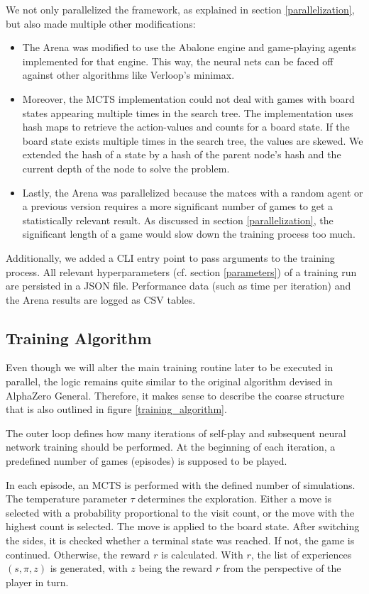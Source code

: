 We not only parallelized the framework, as explained in section \ref{parallelization}, but also made multiple other modifications:
\begin{itemize}
    \item The Arena was modified to use the Abalone engine \cite{claussen_abalone_2021} and game-playing agents implemented for that engine. This way, the neural nets can be faced off against other algorithms like Verloop's minimax.
    \item Moreover, the MCTS implementation could not deal with games with board states appearing multiple times in the search tree. The implementation uses hash maps to retrieve the action-values and counts for a board state. If the board state exists multiple times in the search tree, the values are skewed. We extended the hash of a state by a hash of the parent node's hash and the current depth of the node to solve the problem.
    \item Lastly, the Arena was parallelized because the matces with a random agent or a previous version requires a more significant number of games to get a statistically relevant result. As discussed in section \ref{parallelization}, the significant length of a game would slow down the training process too much.
\end{itemize}

Additionally, we added a CLI entry point to pass arguments to the training process. All relevant hyperparameters (cf. section \ref{parameters}) of a training run are persisted in a JSON file. Performance data (such as time per iteration) and the Arena results are logged as CSV tables.

\subsection{Training Algorithm}
Even though we will alter the main training routine later to be executed in parallel, the logic remains quite similar to the original algorithm devised in AlphaZero General. Therefore, it makes sense to describe the coarse structure that is also outlined in figure \ref{training_algorithm}.

The outer loop defines how many iterations of self-play and subsequent neural network training should be performed. At the beginning of each iteration, a predefined number of games (episodes) is supposed to be played.

In each episode, an MCTS is performed with the defined number of simulations. The temperature parameter $\tau$ determines the exploration. Either a move is selected with a probability proportional to the visit count, or the move with the highest count is selected. The move is applied to the board state. After switching the sides, it is checked whether a terminal state was reached. If not, the game is continued. Otherwise, the reward $r$ is calculated. With $r$, the list of experiences $(s, \pi, z)$ is generated, with $z$ being the reward $r$ from the perspective of the player in turn.

